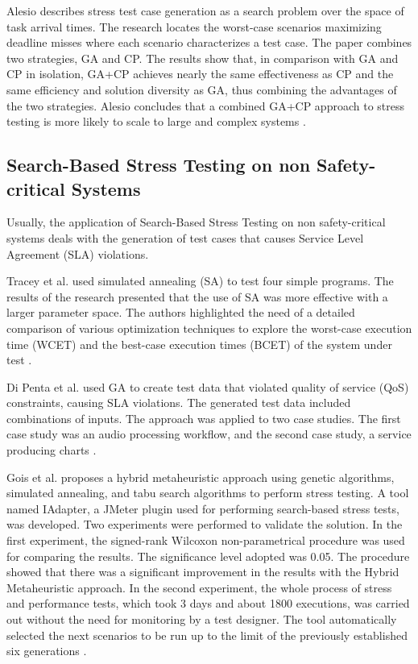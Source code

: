 \documentclass[espaco=umemeio,chapter=TITLE,twoside,openright]{abnt}
\begin{document}
Alesio describes stress test case generation as a search problem over the space of task arrival times. The research locates the  worst-case scenarios maximizing deadline misses where each scenario characterizes a test case. The paper combines two strategies, GA and CP. The results show that, in comparison with GA and CP in isolation, GA+CP achieves nearly the same effectiveness as CP and the same efficiency and solution diversity as GA, thus combining the advantages of the two strategies. Alesio concludes that a combined GA+CP approach to stress testing is more likely to scale to large and complex systems \cite{Alesio2015}.

\subsection{Search-Based Stress Testing on non Safety-critical Systems}

Usually, the application of Search-Based Stress Testing on non safety-critical systems deals with the generation of test cases that causes Service Level Agreement (SLA) violations.


Tracey et al. \cite{Tracey1998} used simulated annealing (SA) to test four
simple programs. The results of the research presented that the use of SA was more effective with a larger parameter space. The authors highlighted the need of a detailed comparison of various optimization techniques to explore the worst-case execution time (WCET) and the best-case execution times (BCET) of the system under test \cite{Tracey1998}.

Di Penta et al. \cite{Penta2007} used GA to create test data that violated quality of service (QoS) constraints, causing SLA violations. The generated test data included combinations of inputs. The approach was applied to two case studies. The first case study was an audio processing workflow, and the second case study, a service producing charts \cite{Penta2007}.


Gois et al. proposes a hybrid metaheuristic approach using genetic algorithms, simulated annealing, and tabu search algorithms to perform stress testing. A tool named IAdapter, a JMeter plugin used for performing search-based stress tests, was developed. Two experiments were performed to validate the solution. In the first experiment, the signed-rank Wilcoxon non-parametrical procedure was used for comparing the results. The significance level adopted was 0.05. The procedure showed that there was a significant improvement in the results with the Hybrid Metaheuristic approach.
In the second experiment, the whole process of stress and performance tests, which took 3 days and about 1800 executions, was carried out without the need for monitoring by a test designer. The tool automatically selected the next scenarios to be run up to the limit of the previously established six generations \cite{Gois2016}.
\end{document}
